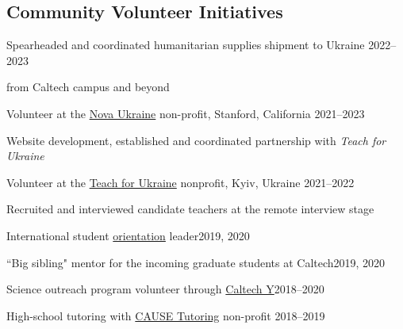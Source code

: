 \documentclass[margin,line]{res}
\newenvironment{list1}{
  \begin{list}{\ding{113}}{%
      \setlength{\itemsep}{0in}
      \setlength{\parsep}{0in} \setlength{\parskip}{0in}
      \setlength{\topsep}{0in} \setlength{\partopsep}{0in} 
      \setlength{\leftmargin}{0.17in}}}{\end{list}}
\begin{document}
\begin{resume}
\section{\sc Community Volunteer Initiatives}
Spearheaded and coordinated humanitarian supplies shipment to Ukraine \href{https://www.caltech.edu/about/news/organizing-aid-to-his-native-ukraine}{\faExternalLink}\hfill{2022--2023}

\begin{list1}
\item[]from Caltech campus and beyond
\end{list1}

\vspace*{-2.5mm}

Volunteer at the \href{https://novaukraine.org/}{Nova Ukraine} non-profit, Stanford, California \hfill{2021--2023}

\begin{list1}
\item[]Website development, established and coordinated partnership with {\em Teach for Ukraine}
\end{list1}

\vspace{-0.3cm}

Volunteer at the \href{https://teachforukraine.org/en/}{Teach for Ukraine} nonprofit, Kyiv, Ukraine \hfill{2021--2022}

\begin{list1}
\item[]Recruited and interviewed candidate teachers at the remote interview stage
\end{list1}

\vspace{-0.3cm}

International student \href{https://international.caltech.edu/Orientation/isp}{orientation} leader\hfill{2019, 2020}

\vspace{-0.3cm}

``Big sibling" mentor for the incoming graduate students at Caltech\hfill{2019, 2020}

\vspace{-0.3cm}

Science outreach program volunteer through \href{https://www.caltechy.org/student-opportunities}{Caltech Y}\hfill{2018--2020}

\vspace{-0.3cm}

High-school tutoring with \href{https://www.facebook.com/CauseTutoring/?locale=zh_CN&paipv=0&eav=AfapFTOSVzUFy0ircWljNcf8AswCiGwIsBsPs-au8kmxfK99t_d4mxVNzcEVvxME7Jw&_rdr}{CAUSE Tutoring} non-profit \hfill{2018--2019}


\end{resume}
\end{document}

